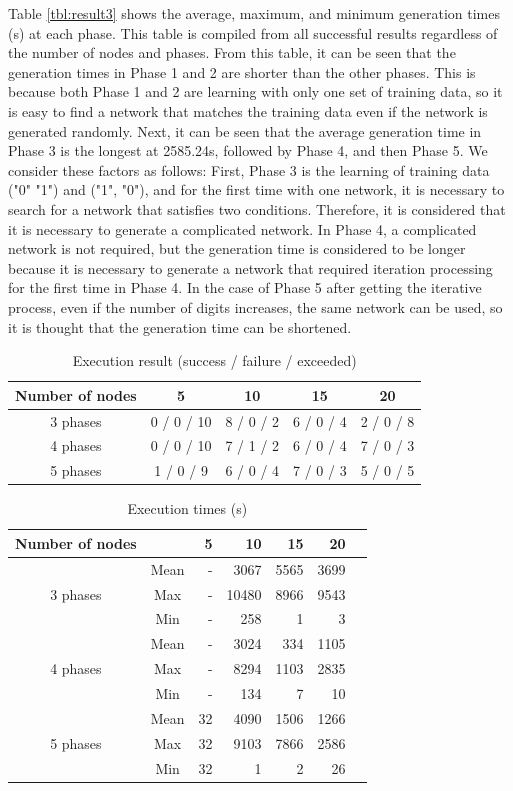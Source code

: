 \documentclass{article}
\begin{document}
Table \ref{tbl:result3} shows the average, maximum, and minimum generation times (s) at each phase.
This table is compiled from all successful results regardless of the number of nodes and phases.
From this table, it can be seen that the generation times in Phase 1 and 2 are shorter than the other phases.
This is because both Phase 1 and 2 are learning with only one set of training data, so it is easy to find a network that matches the training data even if the network is generated randomly.
Next, it can be seen that the average generation time in Phase 3 is the longest at 2585.24s, followed by Phase 4, and then Phase 5.
We consider these factors as follows:
First, Phase 3 is the learning of training data ("0" "1") and ("1", "0"), and for the first time with one network, it is necessary to search for a network that satisfies two conditions.
Therefore, it is considered that it is necessary to generate a complicated network.
In Phase 4, a complicated network is not required, but the generation time is considered to be longer because it is necessary to generate a network that required iteration processing for the first time in Phase 4.
In the case of Phase 5 after getting the iterative process, even if the number of digits increases, the same network can be used, so it is thought that the generation time can be shortened.

\begin{table}[htbp]
\centering
\caption {Execution result (success / failure / exceeded)}
\label{tbl:result1}
\begin{tabular}{c|cccc}
    Number of nodes &5&10&15&20\\
    \hline \hline
    3 phases &0 / 0 / 10&8 / 0 / 2&6 / 0 / 4&2 / 0 / 8\\
    4 phases &0 / 0 / 10&7 / 1 / 2&6 / 0 / 4&7 / 0 / 3\\
    5 phases &1 / 0 / 9&6 / 0 / 4&7 / 0 / 3&5 / 0 / 5\\
    \hline
\end{tabular}
\end{table}

\begin{table}[htbp]
\centering
\caption {Execution times (s)}
\label{tbl:result2}
\begin{tabular}{c|crrrrr}
    Number of nodes & & 5& 10& 15& 20\\
    \hline \hline
            & Mean & -&  3067& 5565& 3699\\
    3 phases& Max  & -& 10480& 8966& 9543\\
            & Min  & -&   258&    1& 3\\
    \hline
            & Mean & -& 3024&  334& 1105\\
    4 phases& Max  & -& 8294& 1103& 2835\\
            & Min  & -& 134&     7&   10\\
    \hline
            & Mean & 32& 4090& 1506& 1266\\
    5 phases& Max  & 32& 9103& 7866& 2586\\
            & Min  & 32&    1&    2& 26\\
    \hline
\end{tabular}
\end{table}
\end{document}
